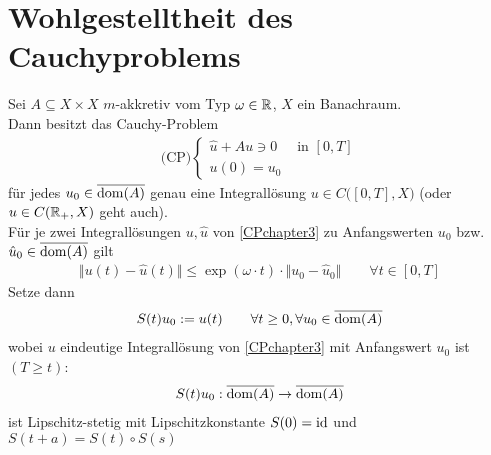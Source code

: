 
\chapter{Wohlgestelltheit des Cauchyproblems} %
\setcounter{section}{1}
\begin{theorem}\label{theoremCrandall-Liggett}\enter
Sei $A\subseteq X\times X$ $m$-akkretiv vom Typ $\omega\in\mathbb{R}$, $X$ ein Banachraum.\\
Dann besitzt das Cauchy-Problem
\begin{align}\label{CPchapter3}\tag{CP}
\text{(CP)}\left\lbrace\begin{array}{rl}
\hat{u}+Au\ni 0&\text{ in }[0,T]\\
u(0)=u_0&
\end{array}\right.
\end{align}
für jedes $u_0\in\overline{\operatorname{dom}(A)}$ genau eine Integrallösung $u\in C\big([0,T],X\big)$ (oder $u\in C(\mathbb{R}_+,X)$ geht auch).\\
Für je zwei Integrallösungen $u,\hat{u}$ von \eqref{CPchapter3} zu Anfangswerten $u_0$ bzw. $\hat{u}_0\in\overline{\operatorname{dom}(A)}$ gilt
\begin{align*}
\big\Vert u(t)-\hat{u}(t)\big\Vert
\leq\exp(\omega\cdot t)\cdot\big\Vert u_0-\hat{u}_0\big\Vert\qquad\forall t\in[0,T]
\end{align*}
Setze dann
\begin{align*}
S(t)u_0:=u(t)\qquad\forall t\geq0,\forall u_0\in\overline{\operatorname{dom}(A)}
\end{align*}
wobei $u$ eindeutige Integrallösung von \eqref{CPchapter3} mit Anfangswert $u_0$ ist $(T\geq t)$:
\begin{align*}
S(t)u_0:\overline{\operatorname{dom}(A)}\to\overline{\operatorname{dom}(A)}
\end{align*}
ist Lipschitz-stetig mit Lipschitzkonstante $S(0)=\operatorname{id}$ und $S(t+a)=S(t)\circ S(s)$
\end{theorem}

